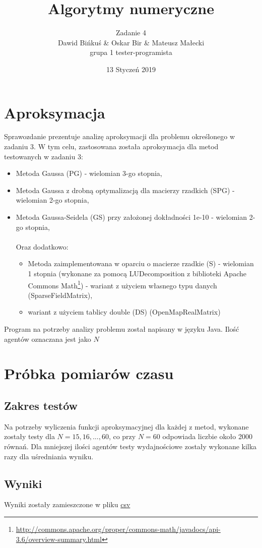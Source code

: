 \documentclass[10pt]{article}
\title{Algorytmy numeryczne}
\author{Zadanie 4 \\ Dawid Bińkuś \& Oskar Bir \& Mateusz Małecki\\grupa 1 tester-programista}
\date{13 Styczeń 2019}
\begin{document}
\maketitle 
\section{Aproksymacja}
Sprawozdanie prezentuje analizę aproksymacji dla problemu określonego w zadaniu 3.
W tym celu, zastosowana została aproksymacja dla metod testowanych w zadaniu 3:
\begin{itemize}
	\item Metoda Gaussa (PG) - wielomian 3-go stopnia,
	\item Metoda Gaussa z drobną optymalizacją dla macierzy rzadkich (SPG) - wielomian 2-go stopnia,
	\item Metoda Gaussa-Seidela (GS) przy założonej dokładności 1e-10 - wielomian 2-go stopnia,
	\\\\Oraz dodatkowo:
	\begin{itemize}
	\item Metoda zaimplementowana w oparciu o macierze rzadkie (S) - wielomian 1 stopnia (wykonane za pomocą LUDecomposition z biblioteki Apache Commons Math\footnote{\url{http://commons.apache.org/proper/commons-math/javadocs/api-3.6/overview-summary.html}}) - wariant z użyciem własnego typu danych (SparseFieldMatrix),
	\item wariant z użyciem tablicy double (DS) (OpenMapRealMatrix)
	\end{itemize}

\end{itemize}
Program na potrzeby analizy problemu został napisany w języku Java.
Ilość agentów oznaczana jest jako $N$
\section{Próbka pomiarów czasu}
\subsection{Zakres testów}
Na potrzeby wyliczenia funkcji aproksymacyjnej dla każdej z metod, wykonane zostały testy dla $N = 15,16,...,60$, co przy $N = 60$ odpowiada liczbie około 2000 równań. Dla mniejszej ilości agentów testy wydajnościowe zostały wykonane kilka razy dla uśredniania wyniku.
\subsection{Wyniki}
Wyniki zostały zamieszczone w pliku \href{run:./files/wyniki.csv}{csv}
\end{document}
